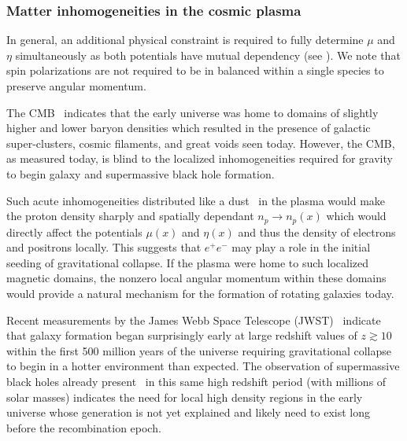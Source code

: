 \subsubsection{Matter inhomogeneities in the cosmic plasma}
\label{sec:inhomogeneous}
\noindent In general, an additional physical constraint is required to fully determine $\mu$ and $\eta$ simultaneously as both potentials have mutual dependency (see ). We note that spin polarizations are not required to be in balanced within a single species to preserve angular momentum.

The CMB~\cite{Planck:2018vyg} indicates that the early universe was home to domains of slightly higher and lower baryon densities which resulted in the presence of galactic super-clusters, cosmic filaments, and great voids seen today. However, the CMB, as measured today, is blind to the localized inhomogeneities required for gravity to begin galaxy and supermassive black hole formation.

Such acute inhomogeneities distributed like a dust~\cite{Grayson:2023flr} in the plasma would make the proton density sharply and spatially dependant $n_{p}\rightarrow n_{p}(x)$ which would directly affect the potentials $\mu(x)$ and $\eta(x)$ and thus the density of electrons and positrons locally. This suggests that $e^{+}e^{-}$ may play a role in the initial seeding of gravitational collapse. If the plasma were home to such localized magnetic domains, the nonzero local angular momentum within these domains would provide a natural mechanism for the formation of rotating galaxies today.

Recent measurements by the James Webb Space Telescope (JWST)~\cite{Yan:2022sxd,adams2023discovery,arrabal2023spectroscopic} indicate that galaxy formation began surprisingly early at large redshift values of $z\gtrsim10$ within the first 500 million years of the universe requiring gravitational collapse to begin in a hotter environment than expected. The observation of supermassive black holes already present~\cite{CEERSTeam:2023qgy} in this same high redshift period (with millions of solar masses) indicates the need for local high density regions in the early universe whose generation is not yet explained and likely need to exist long before the recombination epoch.

